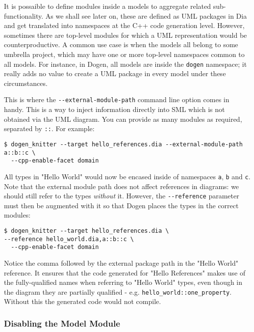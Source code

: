 \documentclass[11pt]{article}
\begin{document}
It is possaible to define modules inside a models to aggregate related
sub-functionality. As we shall see later on, these are defined as UML
packages in Dia and get translated into namespaces at the C++ code
generation level. However, sometimes there are top-level modules for
which a UML representation would be counterproductive. A common use
case is when the models all belong to some umbrella project, which may
have one or more top-level namespaces common to all models. For
instance, in Dogen, all models are inside the \texttt{dogen} namespace; it
really adds no value to create a UML package in every model under
these circumstances.

This is where the \texttt{-{}-external-module-path} command line option comes
in handy. This is a way to inject information directly into SML which
is not obtained via the UML diagram. You can provide as many modules
as required, separated by \texttt{::}. For example:

\begin{verbatim}
$ dogen_knitter --target hello_references.dia --external-module-path a::b::c \
  --cpp-enable-facet domain
\end{verbatim}

All types in "Hello World" would now be encased inside of namespaces
\texttt{a}, \texttt{b} and \texttt{c}. Note that the external module path does not affect
references in diagrams: we should still refer to the types \emph{without}
it. However, the \texttt{-{}-reference} parameter must then be augmented with
it so that Dogen places the types in the correct modules:

\begin{verbatim}
$ dogen_knitter --target hello_references.dia \
--reference hello_world.dia,a::b::c \
  --cpp-enable-facet domain
\end{verbatim}

Notice the comma followed by the external package path in the "Hello
World" reference. It ensures that the code generated for "Hello
References" makes use of the fully-qualified names when referring to
"Hello World" types, even though in the diagram they are partially
qualified - e.g. \texttt{hello\_world::one\_property}. Without this the
generated code would not compile.

\subsubsection{Disabling the Model Module}
\label{sec-3-2-11}
\end{document}
